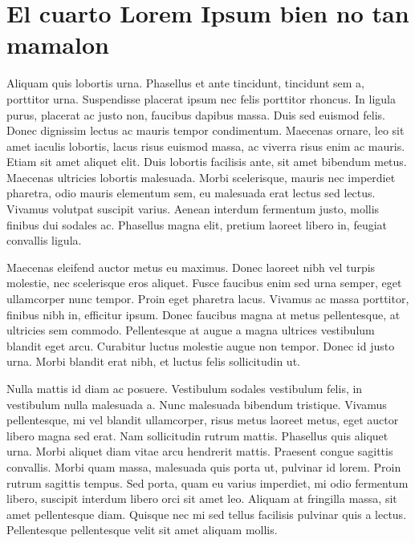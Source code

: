 
\section{El cuarto Lorem Ipsum bien no tan mamalon}
\label{secLoremIpsumCap4}

Aliquam quis lobortis urna. Phasellus et ante tincidunt, tincidunt sem a, porttitor urna. Suspendisse placerat ipsum nec felis porttitor rhoncus. In ligula purus, placerat ac justo non, faucibus dapibus massa. Duis sed euismod felis. Donec dignissim lectus ac mauris tempor condimentum. Maecenas ornare, leo sit amet iaculis lobortis, lacus risus euismod massa, ac viverra risus enim ac mauris. Etiam sit amet aliquet elit. Duis lobortis facilisis ante, sit amet bibendum metus. Maecenas ultricies lobortis malesuada. Morbi scelerisque, mauris nec imperdiet pharetra, odio mauris elementum sem, eu malesuada erat lectus sed lectus. Vivamus volutpat suscipit varius. Aenean interdum fermentum justo, mollis finibus dui sodales ac. Phasellus magna elit, pretium laoreet libero in, feugiat convallis ligula.

Maecenas eleifend auctor metus eu maximus. Donec laoreet nibh vel turpis molestie, nec scelerisque eros aliquet. Fusce faucibus enim sed urna semper, eget ullamcorper nunc tempor. Proin eget pharetra lacus. Vivamus ac massa porttitor, finibus nibh in, efficitur ipsum. Donec faucibus magna at metus pellentesque, at ultricies sem commodo. Pellentesque at augue a magna ultrices vestibulum blandit eget arcu. Curabitur luctus molestie augue non tempor. Donec id justo urna. Morbi blandit erat nibh, et luctus felis sollicitudin ut.

Nulla mattis id diam ac posuere. Vestibulum sodales vestibulum felis, in vestibulum nulla malesuada a. Nunc malesuada bibendum tristique. Vivamus pellentesque, mi vel blandit ullamcorper, risus metus laoreet metus, eget auctor libero magna sed erat. Nam sollicitudin rutrum mattis. Phasellus quis aliquet urna. Morbi aliquet diam vitae arcu hendrerit mattis. Praesent congue sagittis convallis. Morbi quam massa, malesuada quis porta ut, pulvinar id lorem. Proin rutrum sagittis tempus. Sed porta, quam eu varius imperdiet, mi odio fermentum libero, suscipit interdum libero orci sit amet leo. Aliquam at fringilla massa, sit amet pellentesque diam. Quisque nec mi sed tellus facilisis pulvinar quis a lectus. Pellentesque pellentesque velit sit amet aliquam mollis.

